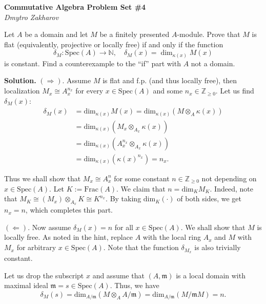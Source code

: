 \documentclass{template}
\begin{document}
\begin{center}
    \Large \textcolor{blue!70!black}{\textbf{Commutative Algebra Problem Set \#4}} \\
    \normalsize \textit{Dmytro Zakharov}
\end{center}

\begin{problem}[Exercise 1]
    Let $A$ be a domain and let $M$ be a finitely presented $A$-module. Prove that 
    $M$ is flat (equivalently, projective or locally free) if and only if the 
    function
    \begin{equation*}
        \delta_M: \text{Spec}(A) \to \mathbb{N}, \quad \delta_M(x) = \dim_{\kappa(x)}M(x)
    \end{equation*}
    is constant. Find a counterexample to the ``if'' part with $A$ not a domain.
\end{problem}

\textbf{Solution.} $(\Rightarrow)$. Assume $M$ is flat and f.p. (and thus locally free), then localization
$M_x \cong A_x^{n_x}$ for every $x \in \text{Spec}(A)$ and some $n_x \in
\mathbb{Z}_{\geq 0}$. Let us find $\delta_M(x)$:
\begin{align*}
    \delta_M(x) &= \text{dim}_{\kappa(x)}M(x) = \text{dim}_{\kappa(x)}(M \otimes_A \kappa(x)) \\
    &= \text{dim}_{\kappa(x)}(M_x \otimes_{A_x} \kappa(x)) \\
    &= \text{dim}_{\kappa(x)}(A_x^{n_x} \otimes_{A_x} \kappa(x)) \\
    &= \text{dim}_{\kappa(x)}(\kappa(x)^{n_x}) = n_x.
\end{align*}

Thus we shall show that $M_x \cong A_x^n$ for some constant $n \in
\mathbb{Z}_{\geq 0}$ not depending on $x \in \text{Spec}(A)$. Let $K :=
\text{Frac}(A)$. We claim that $n = \text{dim}_KM_K$. Indeed, note that $M_K
\cong (M_x) \otimes_{A_x} K \cong K^{n_x}$. By taking $\text{dim}_K(\cdot)$ of
both sides, we get $n_x=n$, which completes this part.

$(\Leftarrow)$. Now assume $\delta_M(x) = n$ for all $x \in \text{Spec}(A)$. We
shall show that $M$ is locally free. As noted in the hint, replace $A$ with the
local ring $A_x$ and $M$ with $M_x$ for arbitrary $x \in \text{Spec}(A)$. Note
that the function $\delta_{M_x}$ is also trivially constant. 

Let us drop the subscript $x$ and assume that $(A,\mathfrak{m})$ is a local
domain with maximal ideal $\mathfrak{m}=s \in \text{Spec}(A)$. Thus, we have
\begin{equation*}
    \delta_M(s) = \text{dim}_{A/\mathfrak{m}}(M \otimes_A A/\mathfrak{m}) = \text{dim}_{A/\mathfrak{m}}(M/\mathfrak{m}M) = n.
\end{equation*}
\end{document}
